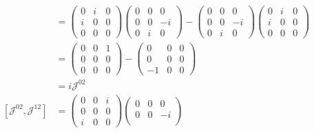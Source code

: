\documentclass{article}
\numberwithin{equation}{section}
\theoremstyle{solution}
\begin{document}
\begin{align*}
        [\mathcal{J}^{01}, \mathcal{J}^{12}] &= 
        \begin{pmatrix}
                0 & i & 0 \\
                i & 0 & 0 \\
                0 & 0 & 0
        \end{pmatrix}
        \begin{pmatrix}
                0 & 0 & 0 \\
                0 & 0 & -i \\
                0 & i & 0
        \end{pmatrix}
        -
        \begin{pmatrix}
                0 & 0 & 0 \\
                0 & 0 & -i \\
                0 & i & 0
        \end{pmatrix}
        \begin{pmatrix}
                0 & i & 0 \\
                i & 0 & 0 \\
                0 & 0 & 0
        \end{pmatrix}
        \\
        &= 
        \begin{pmatrix}
                0 & 0 & 1 \\
                0 & 0 & 0 \\
                0 & 0 & 0
        \end{pmatrix}
        -
        \begin{pmatrix}
                0 & 0 & 0 \\
                0 & 0 & 0 \\
                -1 & 0 & 0
        \end{pmatrix}
        \\
        &= 
        i \mathcal{J}^{02} \\
        [\mathcal{J}^{02}, \mathcal{J}^{12}] &= 
        \begin{pmatrix}
                0 & 0 & i \\
                0 & 0 & 0 \\
                i & 0 & 0
        \end{pmatrix}
        \begin{pmatrix}
                0 & 0 & 0 \\
                0 & 0 & -i \\

\end{pmatrix}
\end{align*}
\end{document}
